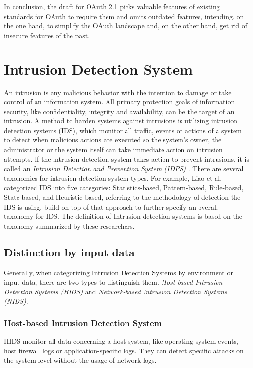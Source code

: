 \documentclass[
    fontsize=12pt,
    headings=small,
    parskip=half,           %
    bibliography=totoc,
    numbers=noenddot,       %
    open=any,               %
    ]{scrreprt}
\begin{document}
In conclusion, the draft for OAuth 2.1 picks valuable features of existing standards for OAuth to require them and omits outdated features, intending, on the one hand, to simplify the OAuth landscape and, on the other hand, get rid of insecure features of the past.

\section{Intrusion Detection System}
An intrusion is any malicious behavior with the intention to damage or take control of an information system. All primary protection goals of information security, like confidentiality, integrity and availability, can be the target of an intrusion. A method to harden systems against intrusions is utilizing intrusion detection systems (IDS), which monitor all traffic, events or actions of a system to detect when malicious actions are executed so the system's owner, the administrator or the system itself can take immediate action on intrusion attempts. If the intrusion detection system takes action to prevent intrusions, it is called an \emph{Intrusion Detection and Prevention System (IDPS)} \cite{scarfone2010intrusion}. There are several taxonomies for intrusion detection system types. For example, Liao et al. \cite{Liao2013IntrusionDS} categorized IDS into five categories: Statistics-based, Pattern-based, Rule-based, State-based, and Heuristic-based, referring to the methodology of detection the IDS is using. \cite{khraisat2019survey} build on top of that approach to further specify an overall taxonomy for IDS. The definition of Intrusion detection systems is based on the taxonomy summarized by these researchers.

\subsection{Distinction by input data}
Generally, when categorizing Intrusion Detection Systems by environment or input data, there are two types to distinguish them. 
\emph{Host-based Intrusion Detection Systems (HIDS)} and \emph{Network-based Intrusion Detection Systems (NIDS)}.
\subsubsection{Host-based Intrusion Detection System}
HIDS monitor all data concerning a host system, like operating system events, host firewall logs or application-specific logs. They can detect specific attacks on the system level without the usage of network logs.
\end{document}
